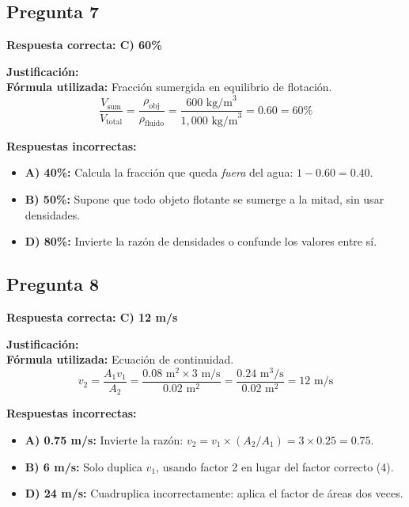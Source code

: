 \begin{respuestabox}
\subsection*{Pregunta 7}
\textcolor{verdecorrecto}{\textbf{Respuesta correcta: C) 60\%}}

\textbf{Justificación:}\\
\textbf{Fórmula utilizada:} Fracción sumergida en equilibrio de flotación.
$$\frac{V_{\text{sum}}}{V_{\text{total}}} = \frac{\rho_{\text{obj}}}{\rho_{\text{fluido}}} = \frac{600 \text{ kg/m}^3}{1{,}000 \text{ kg/m}^3} = 0.60 = 60\%$$

\textbf{Respuestas incorrectas:}
\begin{itemize}
    \item \textbf{A) 40\%:} Calcula la fracción que queda \textit{fuera} del agua: $1 - 0.60 = 0.40$.
    \item \textbf{B) 50\%:} Supone que todo objeto flotante se sumerge a la mitad, sin usar densidades.
    \item \textbf{D) 80\%:} Invierte la razón de densidades o confunde los valores entre sí.
\end{itemize}
\end{respuestabox}

\begin{respuestabox}
\subsection*{Pregunta 8}
\textcolor{verdecorrecto}{\textbf{Respuesta correcta: C) 12 m/s}}

\textbf{Justificación:}\\
\textbf{Fórmula utilizada:} Ecuación de continuidad.
$$v_2 = \frac{A_1 v_1}{A_2} = \frac{0.08 \text{ m}^2 \times 3 \text{ m/s}}{0.02 \text{ m}^2} = \frac{0.24 \text{ m}^3/\text{s}}{0.02 \text{ m}^2} = 12 \text{ m/s}$$

\textbf{Respuestas incorrectas:}
\begin{itemize}
    \item \textbf{A) 0.75 m/s:} Invierte la razón: $v_2 = v_1 \times (A_2/A_1) = 3 \times 0.25 = 0.75$.
    \item \textbf{B) 6 m/s:} Solo duplica $v_1$, usando factor 2 en lugar del factor correcto (4).
    \item \textbf{D) 24 m/s:} Cuadruplica incorrectamente: aplica el factor de áreas dos veces.
\end{itemize}
\end{respuestabox}

